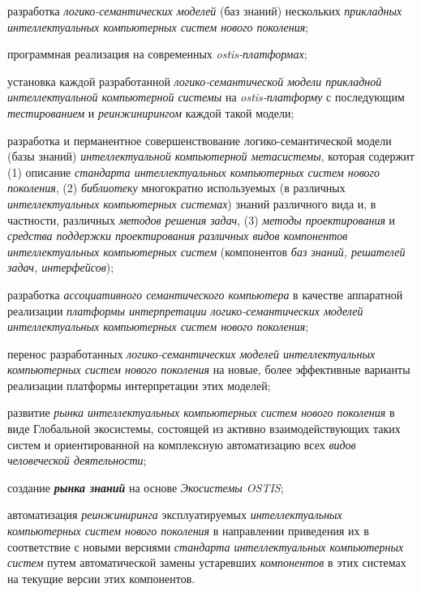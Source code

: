 \begin{textitemize}
	\begin{textitemize}
		\item
		разработка \textit{логико-семантических моделей} (баз знаний) нескольких \textit{прикладных интеллектуальных компьютерных систем нового поколения};
		\item
		программная реализация на современных \textit{ostis-платформах};
		\item
		установка каждой разработанной \textit{логико-семантической модели прикладной интеллектуальной компьютерной системы} на \textit{ostis-платформу} с последующим \textit{тестированием} и \textit{реинжинирингом} каждой такой модели;
		\item
		разработка и перманентное совершенствование логико-семантической модели (базы знаний) \textit{интеллектуальной компьютерной метасистемы}, которая содержит (1) описание \textit{стандарта интеллектуальных компьютерных систем нового поколения}, (2) \textit{библиотеку} многократно используемых (в различных \textit{интеллектуальных компьютерных системах}) знаний различного вида и, в частности, различных \textit{методов решения задач}, (3) \textit{методы проектирования} и \textit{средства поддержки проектирования} \textit{различных видов компонентов интеллектуальных компьютерных систем} (компонентов \textit{баз знаний, решателей задач, интерфейсов});
		\item
		разработка \textit{ассоциативного семантического компьютера} в качестве аппаратной реализации \textit{платформы интерпретации логико-семантических моделей интеллектуальных компьютерных систем нового поколения};
		\item
		перенос разработанных \textit{логико-семантических моделей интеллектуальных компьютерных систем нового поколения} на новые, более эффективные варианты реализации платформы интерпретации этих моделей;
		\item
		развитие \textit{рынка интеллектуальных компьютерных систем нового поколения} в виде Глобальной экосистемы, состоящей из активно взаимодействующих таких систем и ориентированной на комплексную автоматизацию всех \textit{видов} \textit{человеческой деятельности};
		\item
		создание \textbf{\textit{рынка знаний}} на основе \textit{Экосистемы OSTIS};
		\item
		автоматизация \textit{реинжиниринга} эксплуатируемых \textit{интеллектуальных компьютерных систем нового поколения} в направлении приведения их в соответствие с новыми версиями \textit{стандарта интеллектуальных компьютерных} \textit{систем} путем автоматической замены устаревших \textit{компонентов} в этих системах на текущие версии этих компонентов.
	\end{textitemize}
\end{textitemize}

